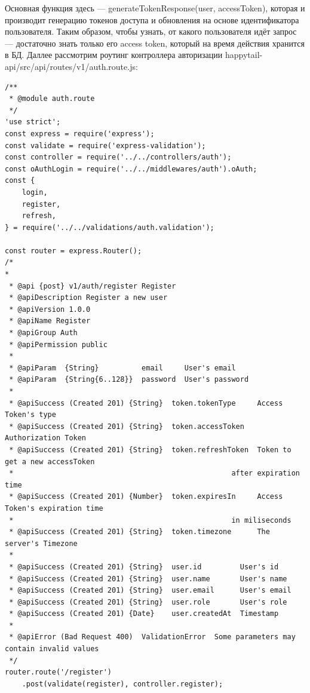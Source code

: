 \documentclass[12pt]{article}
\begin{document}
Основная функция здесь --- generateTokenResponse(user, accessToken), которая и производит генерацию токенов доступа и обновления на основе идентификатора пользователя. Таким образом, чтобы узнать, от какого пользователя идёт запрос --- достаточно знать только его access token, который на время действия хранится в БД. Даллее рассмотрим роутинг контроллера авторизации happytail-api/src/api/routes/v1/auth.route.js: 
\footnotesize
\begin{verbatim}
/**
 * @module auth.route
 */
'use strict';
const express = require('express');
const validate = require('express-validation');
const controller = require('../../controllers/auth');
const oAuthLogin = require('../../middlewares/auth').oAuth;
const {
    login,
    register,
    refresh,
} = require('../../validations/auth.validation');

const router = express.Router();
/*
*
 * @api {post} v1/auth/register Register
 * @apiDescription Register a new user
 * @apiVersion 1.0.0
 * @apiName Register
 * @apiGroup Auth
 * @apiPermission public
 *
 * @apiParam  {String}          email     User's email
 * @apiParam  {String{6..128}}  password  User's password
 *
 * @apiSuccess (Created 201) {String}  token.tokenType     Access Token's type
 * @apiSuccess (Created 201) {String}  token.accessToken   Authorization Token
 * @apiSuccess (Created 201) {String}  token.refreshToken  Token to get a new accessToken
 *                                                   after expiration time
 * @apiSuccess (Created 201) {Number}  token.expiresIn     Access Token's expiration time
 *                                                   in miliseconds
 * @apiSuccess (Created 201) {String}  token.timezone      The server's Timezone
 *
 * @apiSuccess (Created 201) {String}  user.id         User's id
 * @apiSuccess (Created 201) {String}  user.name       User's name
 * @apiSuccess (Created 201) {String}  user.email      User's email
 * @apiSuccess (Created 201) {String}  user.role       User's role
 * @apiSuccess (Created 201) {Date}    user.createdAt  Timestamp
 *
 * @apiError (Bad Request 400)  ValidationError  Some parameters may contain invalid values
 */
router.route('/register')
    .post(validate(register), controller.register);



\end{verbatim}
\end{document}
